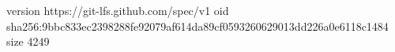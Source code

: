 version https://git-lfs.github.com/spec/v1
oid sha256:9bbc833ec2398288fe92079af614da89cf0593260629013dd226a0e6118c1484
size 4249
